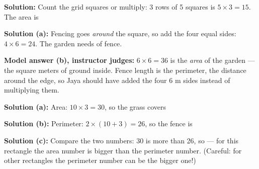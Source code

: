 \documentclass[12pt]{article}
\begin{document}

\textbf{Solution:} Count the grid squares or multiply: 3 rows of 5 squares is
$5 \times 3 = 15$. The area is 


\textbf{Solution (a):} Fencing goes \emph{around} the square, so add the four
equal sides: $4 \times 6 = 24$. The garden needs  of fence.

\textbf{Model answer (b), instructor judges:} $6 \times 6 = 36$ is the
\emph{area} of the garden --- the square meters of ground inside. Fence length
is the perimeter, the distance around the edge, so Jaya should have added the
four 6 m sides instead of multiplying them.


\textbf{Solution (a):} Area: $10 \times 3 = 30$, so the grass covers

\textbf{Solution (b):} Perimeter: $2 \times (10 + 3) = 26$, so the fence is

\textbf{Solution (c):} Compare the two numbers: 30 is more than 26, so
 --- for this rectangle the area number is bigger than the
perimeter number. (Careful: for other rectangles the perimeter number can be
the bigger one!)
\end{document}
